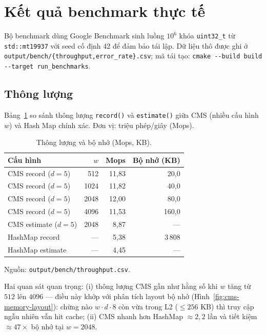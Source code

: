 \section{Kết quả benchmark thực tế}
\label{sec:impl-bench}

Bộ benchmark  dùng Google Benchmark sinh luồng $10^6$ khóa \texttt{uint32\_t} từ \texttt{std::mt19937} với seed cố định 42 để đảm bảo tái lập. Dữ liệu thô được ghi ở \texttt{output/bench/\{throughput,error\_rate\}.csv}; mã tái tạo: \verb|cmake --build build --target run_benchmarks|.

\subsection{Thông lượng}

Bảng~\ref{tab:bench-throughput} so sánh thông lượng \texttt{record()} và \texttt{estimate()} giữa CMS (nhiều cấu hình $w$) và Hash Map chính xác. Đơn vị: triệu phép/giây (Mops).

\begin{table}[H]
  \centering
  \caption{Thông lượng và bộ nhớ (Mops, KB).}
  \label{tab:bench-throughput}
  \small
  \begin{tabular}{@{}l r r r@{}}
    \toprule
    \textbf{Cấu hình}        & \textbf{$w$} & \textbf{Mops} & \textbf{Bộ nhớ (KB)} \\
    \midrule
    CMS record ($d=5$)       & 512   & 11{,}83 & 20{,}0 \\
    CMS record ($d=5$)       & 1024  & 11{,}82 & 40{,}0 \\
    CMS record ($d=5$)       & 2048  & 12{,}00 & 80{,}0 \\
    CMS record ($d=5$)       & 4096  & 11{,}53 & 160{,}0 \\
    CMS estimate ($d=5$)     & 2048  &  8{,}87 & --- \\
    HashMap record           & ---   &  5{,}38 & 3\,808 \\
    HashMap estimate         & ---   &  4{,}45 & --- \\
    \bottomrule
  \end{tabular}
\end{table}

\noindent Nguồn: \texttt{output/bench/throughput.csv}.

Hai quan sát quan trọng: (i) thông lượng CMS gần như hằng số khi $w$ tăng từ $512$ lên $4096$ --- điều này khớp với phân tích layout bộ nhớ (Hình~\ref{fig:cms-memory-layout}): chừng nào $w \cdot d \cdot 8$ còn vừa trong L2 ($\le 256$ KB) thì truy cập ngẫu nhiên vẫn hit cache; (ii) CMS nhanh hơn HashMap $\approx 2{,}2$ lần và tiết kiệm $\approx 47\times$ bộ nhớ tại $w = 2048$.

